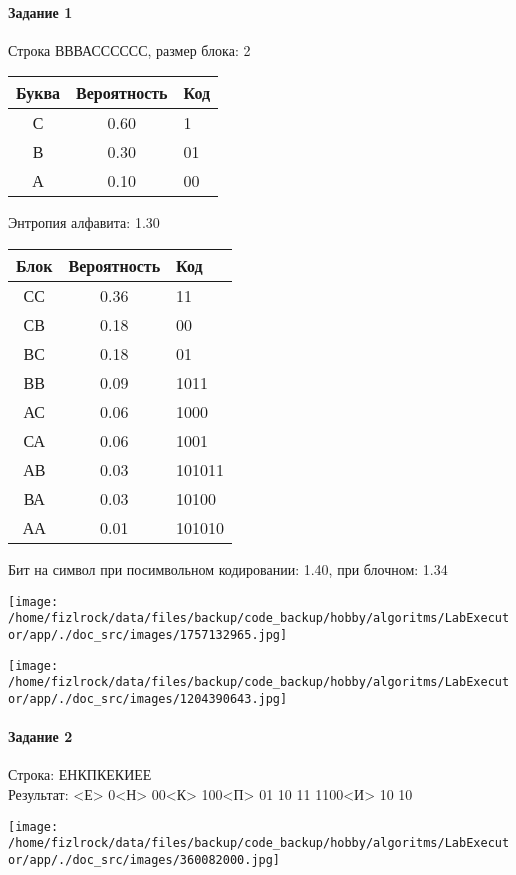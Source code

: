 \documentclass[a4paper, 12pt]{article}
\begin{document}
\paragraph{Задание 1}

Строка ВВВАСССССС, размер блока: 2
\begin{center}
 \begin{tabular}{ |c|c|l| } 
  \hline
     Буква & Вероятность & Код\\ \hline
С & 0.60 & 1\\\hline
В & 0.30 & 01\\\hline
А & 0.10 & 00
\\ \hline \end{tabular}
\end{center}
Энтропия алфавита: 1.30
\begin{center}
 \begin{tabular}{ |c|c|l| } 
  \hline
     Блок & Вероятность & Код\\ \hline
СС & 0.36 & 11\\\hline
СВ & 0.18 & 00\\\hline
ВС & 0.18 & 01\\\hline
ВВ & 0.09 & 1011\\\hline
АС & 0.06 & 1000\\\hline
СА & 0.06 & 1001\\\hline
АВ & 0.03 & 101011\\\hline
ВА & 0.03 & 10100\\\hline
АА & 0.01 & 101010
\\ \hline \end{tabular}
\end{center}
Бит на символ при посимвольном кодировании: 1.40, при блочном: 1.34

\texttt{[image: /home/fizlrock/data/files/backup/code\_backup/hobby/algoritms/LabExecutor/app/./doc\_src/images/1757132965.jpg]}

\texttt{[image: /home/fizlrock/data/files/backup/code\_backup/hobby/algoritms/LabExecutor/app/./doc\_src/images/1204390643.jpg]}
\pagebreak
\paragraph{Задание 2}

Строка: 
ЕНКПКЕКИЕЕ\\
Результат: <Е> 0<Н> 00<К> 100<П> 01 10 11 1100<И> 10 10

\texttt{[image: /home/fizlrock/data/files/backup/code\_backup/hobby/algoritms/LabExecutor/app/./doc\_src/images/360082000.jpg]}
\end{document}
